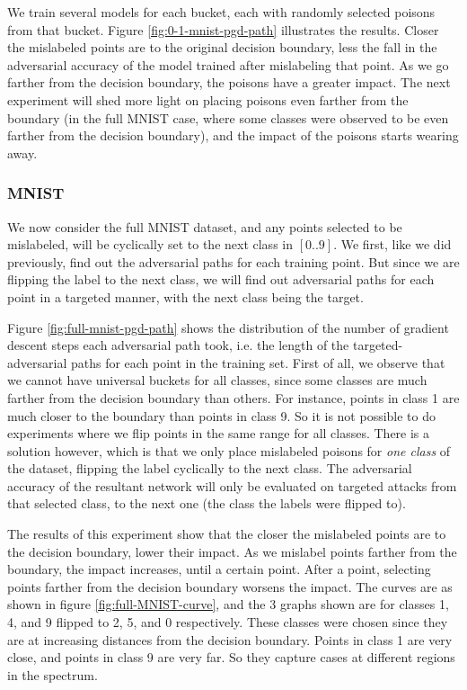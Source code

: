 \documentclass[12pt, oneside]{book}
\begin{document}
    We train several models for each bucket, each with randomly selected poisons
    from that bucket. Figure \ref{fig:0-1-mnist-pgd-path} illustrates the results.
    Closer the mislabeled points are to the original decision boundary, less the
    fall in the adversarial accuracy of the model trained after mislabeling that
    point. As we go farther from the decision boundary, the poisons have a
    greater impact. The next experiment will shed more light on placing poisons
    even farther from the boundary (in the full MNIST case, where some classes
    were observed to be even farther from the decision boundary), and the impact
    of the poisons starts wearing away.

    

\subsubsection{MNIST}
    We now consider the full MNIST dataset, and any points selected to be
    mislabeled, will be cyclically set to the next class in $[0..9]$. We first,
    like we did previously, find out the adversarial paths for each training
    point. But since we are flipping the label to the next class, we will find
    out adversarial paths for each point in a targeted manner, with the next
    class being the target.

    Figure \ref{fig:full-mnist-pgd-path} shows the distribution of the number of
    gradient descent steps each adversarial path took, i.e. the length of the
    targeted-adversarial paths for each point in the training set. First of all,
    we observe that we cannot have universal buckets for all classes, since some
    classes are much farther from the decision boundary than others. For
    instance, points in class 1 are much closer to the boundary than points in
    class 9. So it is not possible to do experiments where we flip points in the
    same range for all classes. There is a solution however, which is that we
    only place mislabeled poisons for \emph{one class} of the dataset, flipping
    the label cyclically to the next class. The adversarial accuracy of the
    resultant network will only be evaluated on targeted attacks from that
    selected class, to the next one (the class the labels were flipped to).

    The results of this experiment show that the closer the mislabeled points
    are to the decision boundary, lower their impact. As we mislabel points
    farther from the boundary, the impact increases, until a certain point.
    After a point, selecting points farther from the decision boundary worsens
    the impact. The curves are as shown in figure \ref{fig:full-MNIST-curve},
    and the 3 graphs shown are for classes 1, 4, and 9 flipped to 2, 5, and 0
    respectively. These classes were chosen since they are at increasing
    distances from the decision boundary. Points in class 1 are very close, and
    points in class 9 are very far. So they capture cases at different regions
    in the spectrum.
\end{document}
